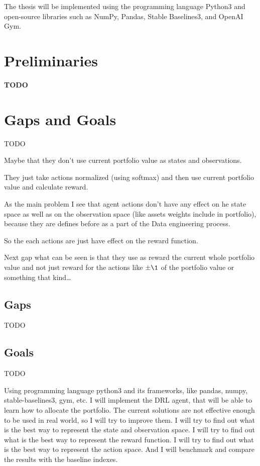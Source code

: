 The thesis will be implemented using the programming language Python3 and open-source libraries such as NumPy, Pandas, Stable Baselines3, and OpenAI Gym.




\chapter{Preliminaries}\label{sec:preliminaries}
\textbf{TODO}


\chapter{Gaps and Goals}\label{ch:gaps-and-goals}
TODO

Maybe that they don't use current portfolio value as states and observations.

They just take actions normalized (using softmax) and then use current portfolio value
and calculate reward.

As the main problem I see that agent actions don't have any effect on he
state space as well as on the observation space (like assets weights include in portfolio),
because they are defines
before as a part of the Data engineering process.

So the each actions are just have effect on the reward function.

Next gap what can be seen is that they use as reward the current whole portfolio value
and not just reward for the actions like $\pm\1$ of the portfolio value or
something that kind\ldots


\section{Gaps}\label{sec:gaps}
TODO


\section{Goals}\label{sec:goals}
TODO

Using programming language python3 and its frameworks, like pandas, numpy, stable-baselines3, gym, etc.
I will implement the DRL agent, that will be able to learn how to allocate the portfolio.
The current solutions are not effective enough to be used in real world, so I will try to improve them.
I will try to find out what is the best way to represent the state and observation space.
I will try to find out what is the best way to represent the reward function.
I will try to find out what is the best way to represent the action space.
And I will benchmark and compare the results with the baseline indexes.

